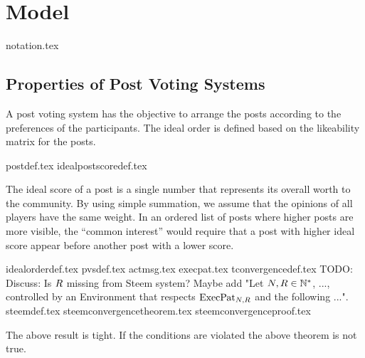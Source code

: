 \section{Model}
  {notation.tex}
  \subsection{Properties of Post Voting Systems}
    A post voting system has the objective to arrange the posts according to the
    preferences of the participants. The ideal order is defined based on the
    likeability matrix for the posts.

    {postdef.tex}
    {idealpostscoredef.tex}

    The ideal score of a post is a single number that represents its overall
    worth to the community. By using simple summation, we assume that the
    opinions of all players have the same weight. In an ordered list of posts
    where higher posts are more visible, the ``common interest'' would require
    that a post with higher ideal score appear before another post with a lower
    score.

    {idealorderdef.tex}
    {pvsdef.tex}
    {actmsg.tex}
    {execpat.tex}
    {tconvergencedef.tex}
    TODO: Discuss: Is $R$ missing from Steem system? Maybe add "Let
    $N, R \in \mathbb{N}^*$, ..., controlled by an Environment
    that respects $\mathrm{ExecPat}_{N, R}$ and the following ...".
    {steemdef.tex}
    {steemconvergencetheorem.tex}
    {steemconvergenceproof.tex}

    The above result is tight.
    If the conditions are violated the above theorem is not true.
